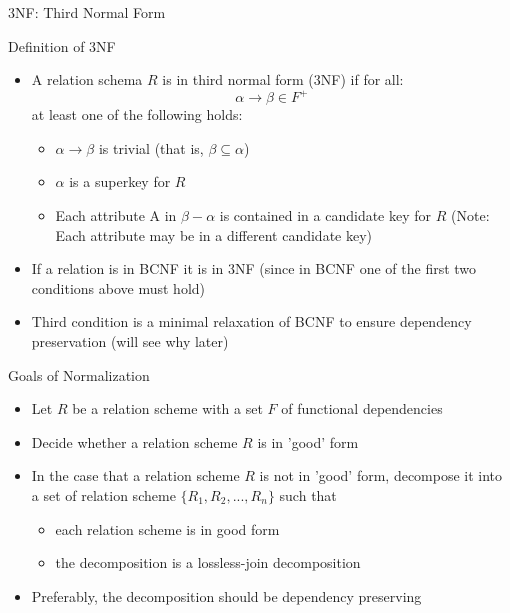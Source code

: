 \documentclass[aspectratio=169, xcolor=dvipsnames]{beamer}
\begin{document}
\begin{frame}{3NF: Third Normal Form}
    \begin{block}{Definition of 3NF}
        \begin{itemize}[<+->]
            \item A relation schema $R$ is in third normal form (3NF) if for all:
            \[ \alpha \rightarrow \beta \in F^+ \]
            at least one of the following holds:
            \begin{itemize}
                \item[$\triangleright$] $\alpha \rightarrow \beta$ is trivial (that is, $\beta \subseteq \alpha$)
                \item[$\triangleright$] $\alpha$ is a superkey for $R$
                \item[$\triangleright$] Each attribute A in $\beta - \alpha$ is contained in a candidate key for $R$ (Note: Each attribute may be in a different candidate key)
            \end{itemize}
        \end{itemize}
    \end{block}
    \begin{itemize}[<+(3)->]
        \item If a relation is in BCNF it is in 3NF (since in BCNF one of the first two conditions above must hold)
        \item Third condition is a minimal relaxation of BCNF to ensure dependency preservation (will see why later)
    \end{itemize}
\end{frame}

\begin{frame}{Goals of Normalization}
    \begin{itemize}[<+->]
        \item Let $R$ be a relation scheme with a set $F$ of functional dependencies
        \item Decide whether a relation scheme $R$ is in 'good' form
        \item In the case that a relation scheme $R$ is not in 'good' form, decompose it into a set of relation scheme $\{R_1, R_2, ..., R_n\}$ such that
        \begin{itemize}
            \item[$\triangleright$] each relation scheme is in good form
            \item[$\triangleright$] the decomposition is a lossless-join decomposition
        \end{itemize}
        \item Preferably, the decomposition should be dependency preserving
    \end{itemize}
\end{frame}
\end{document}
